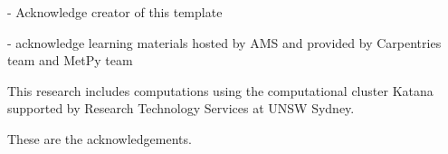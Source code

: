 \begin{acknowledgements}
	
- Acknowledge creator of this template

- acknowledge learning materials hosted by AMS and provided by Carpentries team and MetPy team

This research includes computations using the computational cluster Katana supported by Research Technology Services at UNSW Sydney.

These are the acknowledgements. \blindtext
\end{acknowledgements}